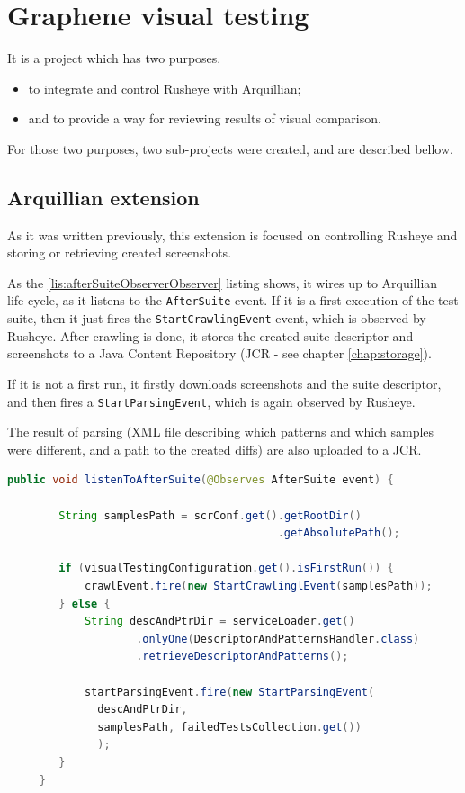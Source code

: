 \documentclass[11pt,oneside,final]{fithesis2}
\begin{document}
\section{Graphene visual testing}
    It is a project which has two purposes.
    \begin{itemize}
     \item to integrate and control Rusheye with Arquillian;
     \item and to provide a way for reviewing results of visual comparison.
    \end{itemize}

    For those two purposes, two sub-projects were created, and are described bellow.
    
    \subsection{Arquillian extension}
    \label{sec:arqExt}
    As it was written previously, this extension is focused on controlling Rusheye and storing or retrieving created screenshots.
    
    As the \ref{lis:afterSuiteObserverObserver} listing shows, it wires up to Arquillian life-cycle, as it listens to the \texttt{AfterSuite} event. 
    If it is a first execution of the test suite, then it just fires the \texttt{StartCrawlingEvent} event, which is observed by Rusheye. 
    After crawling is done, it stores the created suite descriptor and screenshots to a Java Content Repository 
    (JCR - see chapter \ref{chap:storage}).
    
    If it is not a first run, it firstly downloads screenshots and the suite descriptor, and then fires a \texttt{StartParsingEvent}, 
    which is again observed by Rusheye.
    
    The result of parsing (XML file describing which patterns and which samples were different, and a path to the created diffs) are also uploaded
    to a JCR.
    
    \begin{lstlisting}[caption=AfterSuite observer to controll Rusheye,label=lis:afterSuiteObserverObserver,language=java, breaklines=true]
     public void listenToAfterSuite(@Observes AfterSuite event) {
        
        String samplesPath = scrConf.get().getRootDir()
                                          .getAbsolutePath();
        
        if (visualTestingConfiguration.get().isFirstRun()) {
            crawlEvent.fire(new StartCrawlinglEvent(samplesPath));
        } else {
            String descAndPtrDir = serviceLoader.get()
                    .onlyOne(DescriptorAndPatternsHandler.class)
                    .retrieveDescriptorAndPatterns();
            
            startParsingEvent.fire(new StartParsingEvent(
		      descAndPtrDir,
		      samplesPath, failedTestsCollection.get())
		      );
        }
     }
    \end{lstlisting}
    
\end{document}
